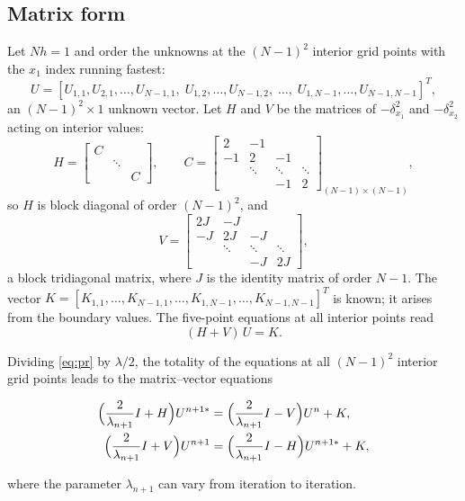 \documentclass[11pt,a4paper]{article}
\numberwithin{equation}{section}
\theoremstyle{spacedplain}
\theoremstyle{spaceddefinition}
\theoremstyle{spacedremark}
\begin{document}
\subsection{Matrix form}

Let \(Nh=1\) and order the unknowns at the \((N-1)^2\) interior grid
points with the \(x_1\) index running fastest:
\[
  U=[U_{1,1},U_{2,1},\dots,U_{N-1,1},\;U_{1,2},\dots,U_{N-1,2},\;
  \dots,\;U_{1,N-1},\dots,U_{N-1,N-1}]^T,
\]
an \((N-1)^2\times1\) unknown vector.  Let \(H\) and \(V\) be the
matrices of \(-\delta_{x_1}^2\) and \(-\delta_{x_2}^2\) acting on
interior values:
\[
  H=\begin{bmatrix}C&&\\ &\ddots&\\ &&C\end{bmatrix},
  \qquad
  C=\begin{bmatrix}
    2&-1&&\\
    -1&2&-1&\\
    &\ddots&\ddots&\ddots\\
    &&-1&2
  \end{bmatrix}_{(N-1)\times(N-1)},
\]
so \(H\) is block diagonal of order \((N-1)^2\), and
\[
  V=\begin{bmatrix}
    2J&-J&&\\
    -J&2J&-J&\\
    &\ddots&\ddots&\ddots\\
    &&-J&2J
  \end{bmatrix},
\]
a block tridiagonal matrix, where \(J\) is the identity matrix of
order \(N-1\).  The vector
\(K=[K_{1,1},\dots,K_{N-1,1},\dots,K_{1,N-1},\dots,K_{N-1,N-1}]^T\) is
known; it arises from the boundary values.  The five-point equations at
all interior points read
\[
  (H+V)\,U=K .
\]

Dividing \eqref{eq:pr} by \(\lambda/2\), the totality of the equations
at all \((N-1)^2\) interior grid points leads to the matrix--vector
equations
\begin{keybox}
\begin{equation}\label{eq:adimat}
\begin{aligned}
  \Bigl(\frac2{\lambda_{n+1}}I+H\Bigr)U^{n+1*}
  &=\Bigl(\frac2{\lambda_{n+1}}I-V\Bigr)U^n+K,\\
  \Bigl(\frac2{\lambda_{n+1}}I+V\Bigr)U^{n+1}
  &=\Bigl(\frac2{\lambda_{n+1}}I-H\Bigr)U^{n+1*}+K,
\end{aligned}
\end{equation}
\end{keybox}
where the parameter \(\lambda_{n+1}\) can vary from iteration to
iteration.
\end{document}
